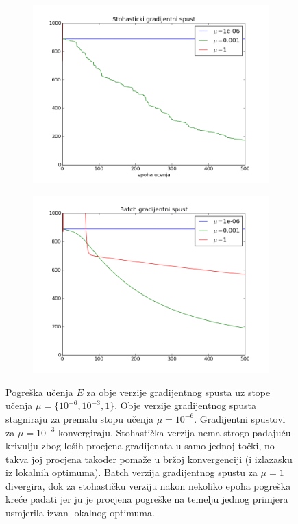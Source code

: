 \documentclass[paper=a4, fontsize=11pt]{scrartcl} %
\numberwithin{equation}{section} %
\numberwithin{figure}{section} %
\numberwithin{table}{section} %
\begin{document}
\begin{figure}[h]
\centering
\begin{subfigure}[b]{0.7\textwidth}
\includegraphics[width=\textwidth]{zad8_1.png}
\end{subfigure}
\begin{subfigure}[b]{0.7\textwidth}
\includegraphics[width=\textwidth]{zad8_2.png}
\end{subfigure}
\caption{Pogreška učenja $E$ za obje verzije gradijentnog spusta uz stope učenja $\mu=\{10^{-6}, 10^{-3}, 1\}$.
Obje verzije gradijentnog spusta stagniraju za premalu stopu učenja $\mu=10^{-6}$.  Gradijentni spustovi za $\mu=10^{-3}$ konvergiraju. Stohastička verzija nema strogo padajuću krivulju zbog loših procjena gradijenata u samo jednoj točki, no takva joj procjena također pomaže u bržoj konvergenciji (i izlazasku iz lokalnih optimuma).
Batch verzija gradijentnog spustu za $\mu = 1$ divergira, dok za stohastičku verziju nakon nekoliko epoha pogreška kreće padati jer ju je procjena pogreške na temelju jednog primjera usmjerila izvan lokalnog optimuma.}
\end{figure}
\end{document}
